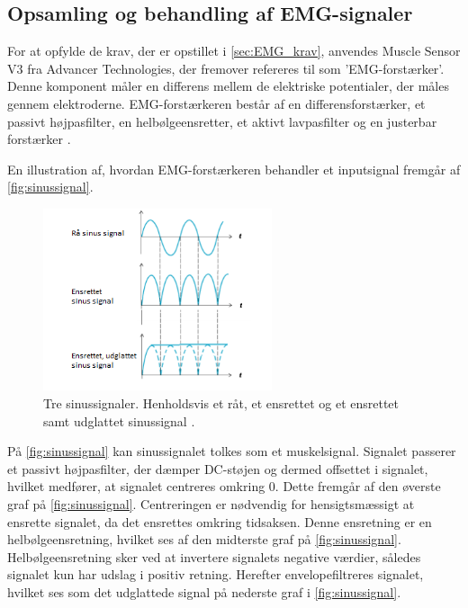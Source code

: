 \subsection{Opsamling og behandling af EMG-signaler} \label{sec:EMG_imp}
For at opfylde de krav, der er opstillet i \autoref{sec:EMG_krav}, anvendes Muscle Sensor V3 fra Advancer Technologies, der fremover refereres til som 'EMG-forstærker'. 
Denne komponent måler en differens mellem de elektriske potentialer, der måles gennem elektroderne. 
EMG-forstærkeren består af en differensforstærker, et passivt højpasfilter, en helbølgeensretter, et aktivt lavpasfilter og en justerbar forstærker \citep{advancertech2013}. 

En illustration af, hvordan EMG-forstærkeren behandler et inputsignal fremgår af \autoref{fig:sinussignal}.
\begin{figure}[H]
\centering
\includegraphics[width=0.6\textwidth]{figures/sinussignal.png}
\caption{Tre sinussignaler. Henholdsvis et råt, et ensrettet og et ensrettet samt udglattet sinussignal \citep{advancertech2013}.}
\label{fig:sinussignal}
\end{figure}

\noindent
På \autoref{fig:sinussignal} kan sinussignalet tolkes som et muskelsignal. 
Signalet passerer et passivt højpasfilter, der dæmper DC-støjen og dermed offsettet i signalet, hvilket medfører, at signalet centreres omkring 0. Dette fremgår af den øverste graf på \autoref{fig:sinussignal}. 
Centreringen er nødvendig for hensigtsmæssigt at ensrette signalet, da det ensrettes omkring tidsaksen. 
Denne ensretning er en helbølgeensretning, hvilket ses af den midterste graf på \autoref{fig:sinussignal}. 
Helbølgeensretning sker ved at invertere signalets negative værdier, således signalet kun har udslag i positiv retning. %
Herefter envelopefiltreres signalet, hvilket ses som det udglattede signal på nederste graf i \autoref{fig:sinussignal}. 

